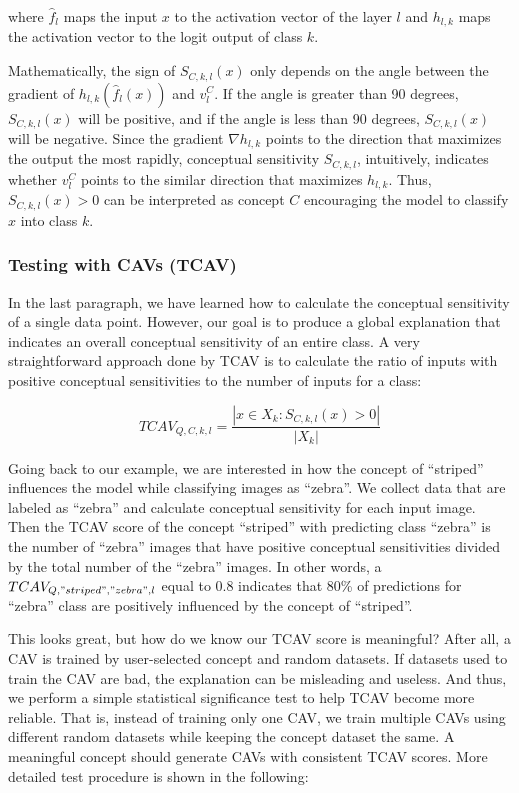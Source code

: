 \documentclass[
  11pt,
]{scrbook}
\begin{document}
where \(\hat{f}_l\) maps the input \(x\) to the activation vector of the layer \(l\) and \(h_{l,k}\) maps the activation vector to the logit output of class \(k\).

Mathematically, the sign of \(S_{C,k,l}(x)\) only depends on the angle between the gradient of \(h_{l,k}(\hat{f}_l(x))\) and \(v_l^C\).
If the angle is greater than 90 degrees, \(S_{C,k,l}(x)\) will be positive, and if the angle is less than 90 degrees, \(S_{C,k,l}(x)\) will be negative.
Since the gradient \(\nabla h_{l,k}\) points to the direction that maximizes the output the most rapidly, conceptual sensitivity \(S_{C,k,l}\), intuitively, indicates whether \(v_l^C\) points to the similar direction that maximizes \(h_{l,k}\).
Thus, \(S_{C,k,l}(x)>0\) can be interpreted as concept \(C\) encouraging the model to classify \(x\) into class \(k\).

\hypertarget{testing-with-cavs-tcav}{%
\subsubsection{Testing with CAVs (TCAV)}\label{testing-with-cavs-tcav}}

In the last paragraph, we have learned how to calculate the conceptual sensitivity of a single data point.
However, our goal is to produce a global explanation that indicates an overall conceptual sensitivity of an entire class.
A very straightforward approach done by TCAV is to calculate the ratio of inputs with positive conceptual sensitivities to the number of inputs for a class:

\[TCAV_{Q,C,k,l}=\frac{|{x\in X_k:S_{C,k,l}(x)>0}|}{|X_k|}\]

Going back to our example, we are interested in how the concept of ``striped'' influences the model while classifying images as ``zebra''.
We collect data that are labeled as ``zebra'' and calculate conceptual sensitivity for each input image.
Then the TCAV score of the concept ``striped'' with predicting class ``zebra'' is the number of ``zebra'' images that have positive conceptual sensitivities divided by the total number of the ``zebra'' images.
In other words, a \(TCAV_{Q, "striped","zebra",l}\) equal to 0.8 indicates that 80\% of predictions for ``zebra'' class are positively influenced by the concept of ``striped''.

This looks great, but how do we know our TCAV score is meaningful?
After all, a CAV is trained by user-selected concept and random datasets.
If datasets used to train the CAV are bad, the explanation can be misleading and useless.
And thus, we perform a simple statistical significance test to help TCAV become more reliable.
That is, instead of training only one CAV, we train multiple CAVs using different random datasets while keeping the concept dataset the same.
A meaningful concept should generate CAVs with consistent TCAV scores.
More detailed test procedure is shown in the following:
\end{document}
